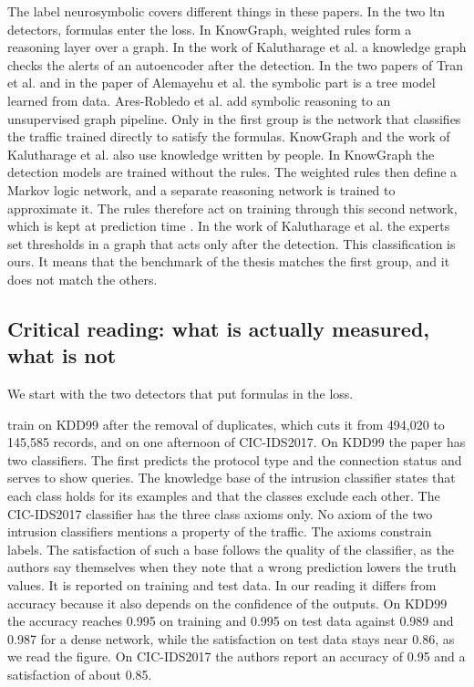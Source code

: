 The label neurosymbolic covers different things in these papers. In the two
\gls{ltn} detectors, formulas enter the loss. In KnowGraph, weighted rules form
a reasoning layer over a graph. In the work of Kalutharage et al. a knowledge
graph checks the alerts of an autoencoder after the detection. In the two papers
of Tran et al. and in the paper of Alemayehu et al. the symbolic part is a tree
model learned from data. Ares-Robledo et al. add symbolic reasoning to an
unsupervised graph pipeline. Only in the first group is the network that
classifies the traffic trained directly to satisfy the formulas. KnowGraph and
the work of Kalutharage et al. also use knowledge written by people. In
KnowGraph the detection models are trained without the rules. The weighted rules
then define a Markov logic network, and a separate reasoning network is trained
to approximate it. The rules therefore act on training through this second
network, which is kept at prediction time \citep{zhou2024knowgraph}. In the work
of Kalutharage et al. the
experts set thresholds in a graph that acts only after the detection.
This classification is ours. It means that the benchmark of the thesis matches the
first group, and it does not match the others.

\subsection{Critical reading: what is actually measured, what is not}
\label{sec:critical-reading}

We start with the two detectors that put formulas in the loss.

\citet{onchis2022neurosymbolic} train on KDD99 after the removal of duplicates,
which cuts it from 494{,}020 to 145{,}585 records, and on one afternoon of
CIC-IDS2017. On KDD99 the paper has two classifiers. The first predicts the
protocol type and the connection status and serves to show queries. The
knowledge base of the intrusion classifier states that each class holds for its
examples and that the classes exclude each other. The CIC-IDS2017 classifier has
the three class axioms only. No axiom of the two intrusion classifiers mentions a
property of the traffic. The axioms constrain labels. The satisfaction of such a
base follows the quality of the classifier, as the authors say themselves when
they note that a wrong prediction lowers the truth values. It is reported on
training and test data. In our reading it differs from accuracy because it also
depends on the confidence of the outputs. On KDD99 the accuracy reaches 0.995 on training and 0.995 on test data
against 0.989 and 0.987 for a dense network, while the satisfaction on test data
stays near 0.86, as we read the figure. On CIC-IDS2017 the authors report an
accuracy of 0.95 and a satisfaction of about 0.85.

